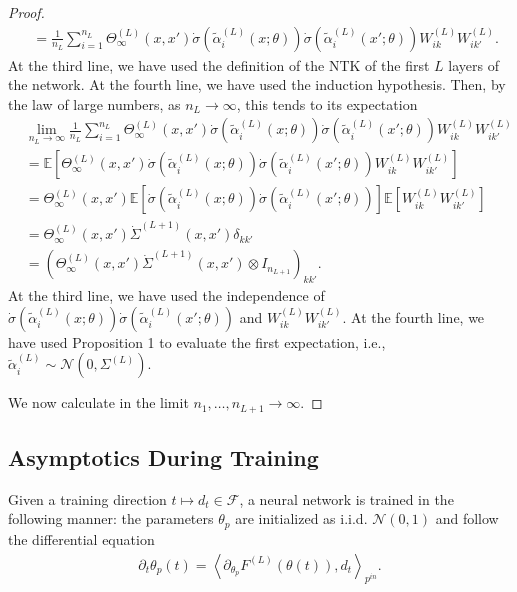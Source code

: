 \documentclass[10pt]{article}
\newcommand{\EE}{\mathbb{E}}
\newcommand{\FF}{\mathcal{F}}
\newcommand{\NN}{\mathcal{N}}
\newcommand*\circled[1]{\tikz[baseline=(char.base)]{\node[shape=circle,draw,inner sep=0.5pt] (char) {#1};}}
\newcommand{\inner}[2]{\left\langle #1, #2 \right\rangle}
\newcommand{\paran}[1]{{( #1 )}}
\newcommand{\pin}{{p^{in}}}
\begin{document}
\begin{proof}
\begin{align*}
&= \frac{1}{n_L} \sum_{i = 1}^{n_L} \Theta^\paran{L}_\infty(x,x') \dot{\sigma}(\tilde{\alpha}^\paran{L}_i(x;\theta)) \dot{\sigma}(\tilde{\alpha}^\paran{L}_{i}(x';\theta)) W^\paran{L}_{ik} W^\paran{L}_{ik'}.
\end{align*}
At the third line, we have used the definition of the NTK of the first $L$ layers of the network. At the fourth line, we have used the induction hypothesis. Then, by the law of large numbers, as $n_L \rightarrow \infty$, this tends to its expectation
\begin{align*}
&\lim_{n_L \rightarrow \infty} \frac{1}{n_L} \sum_{i = 1}^{n_L} \Theta^\paran{L}_\infty(x,x') \dot{\sigma}(\tilde{\alpha}^\paran{L}_i(x;\theta)) \dot{\sigma}(\tilde{\alpha}^\paran{L}_{i}(x';\theta)) W^\paran{L}_{ik} W^\paran{L}_{ik'} \\
&= \EE \left[ \Theta^\paran{L}_\infty(x,x') \dot{\sigma}(\tilde{\alpha}^\paran{L}_i(x;\theta)) \dot{\sigma}(\tilde{\alpha}^\paran{L}_{i}(x';\theta)) W^\paran{L}_{ik} W^\paran{L}_{ik'} \right] \\
&= \Theta^\paran{L}_\infty(x,x') \EE \left[ \dot{\sigma}(\tilde{\alpha}^\paran{L}_i(x;\theta)) \dot{\sigma}(\tilde{\alpha}^\paran{L}_{i}(x';\theta)) \right] \EE \left[ W^\paran{L}_{ik} W^\paran{L}_{ik'} \right] \\
&= \Theta^\paran{L}_\infty(x,x') \dot{\Sigma}^\paran{L + 1}(x,x') \delta_{kk'} \\
&= (\Theta^\paran{L}_\infty(x,x') \dot{\Sigma}^\paran{L + 1}(x,x') \otimes I_{n_{L + 1}})_{kk'}.
\end{align*}
At the third line, we have used the independence of $\dot{\sigma}(\tilde{\alpha}^\paran{L}_i(x;\theta)) \dot{\sigma}(\tilde{\alpha}^\paran{L}_{i}(x';\theta))$ and $W^\paran{L}_{ik} W^\paran{L}_{ik'}$. At the fourth line, we have used Proposition 1 to evaluate the first expectation, i.e., $\tilde{\alpha}^\paran{L}_i \sim \NN(0,\Sigma^\paran{L})$.

We now calculate \circled{2} in the limit $n_1, \ldots, n_{L + 1} \rightarrow \infty$.



\end{proof}

\newpage

\subsection{Asymptotics During Training}

Given a training direction $t \mapsto d_t \in \FF$, a neural network is trained in the following manner: the parameters $\theta_p$ are initialized as i.i.d. $\NN(0,1)$ and follow the differential equation
\begin{align*}
\partial_t \theta_p(t) = \inner{\partial_{\theta_p} F^\paran{L}(\theta(t))}{d_t}_\pin.
\end{align*}
\end{document}
